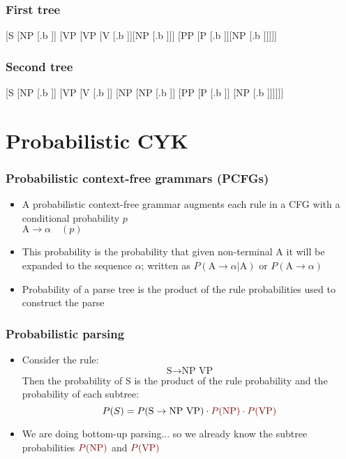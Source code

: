 \begin{frame}
  \frametitle{First tree}
  \begin{center}
    [S [NP [.b ]]
                   [VP [VP [V [.b ]][NP [.b ]]]
                       [PP [P [.b ]][NP [.b ]]]]]
   \end{center}
\end{frame}

\begin{frame}
  \frametitle{Second tree}
  \begin{center}
    [S [NP [.b ]]
                   [VP [V [.b ]]
                       [NP [NP [.b ]]
                           [PP [P [.b ]]
                               [NP [.b ]]]]]]
   \end{center}
\end{frame}




\section{Probabilistic CYK}

\begin{frame}
  \frametitle{Probabilistic context-free grammars (PCFGs)}
  \begin{itemize}
  \item A probabilistic context-free grammar augments each rule in a
    CFG with a conditional probability $p$\\
    $\mbox{A} \rightarrow \alpha \quad (p)$
  \item This probability is the probability that given non-terminal
    A it will be expanded to the sequence $\alpha$;  written as $P(\mbox{A}
    \rightarrow \alpha | \mbox{A})$ or $P(\mbox{A} \rightarrow
    \alpha)$
  \item Probability of a parse tree is the product of the rule
    probabilities used to construct the parse
  \end{itemize}
\end{frame}

\begin{frame}
  \frametitle{Probabilistic parsing}
  \begin{itemize}
  \item Consider the rule:
    \[ \mbox{S} \rightarrow \mbox{NP VP} \]
    Then the probability of S is the product of the rule probability
    and the probability of each subtree:
    \[ P(S) = P(\mbox{S} \rightarrow \mbox{NP VP}) 
    \cdot \textcolor{brickred}{P(\mbox{NP}) \cdot P(\mbox{VP})} \]
  \item We are doing bottom-up parsing... so we already know the
    subtree probabilities $\textcolor{brickred}{P(\mbox{NP})}$ and 
    $\textcolor{brickred}{P(\mbox{VP})}$
  \end{itemize}
\end{frame}

